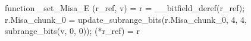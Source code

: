 function _set_Misa_E (r_ref, v) = {
    r = __bitfield_deref(r_ref);
    r.Misa_chunk_0 = update_subrange_bits(r.Misa_chunk_0, 4, 4, subrange_bits(v, 0, 0));
    (*r_ref) = r
}
